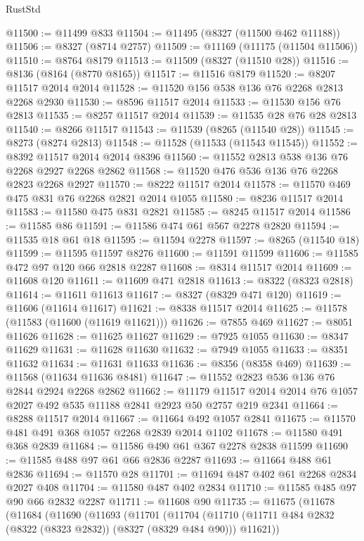 \begin{lexlean}{RustStd}
\begin{coremodule}
@11500 := @11499 @833
@11504 := @11495 (@8327 (@11500 @462 @11188))
@11506 := @8327 (@8714 @2757)
@11509 := @11169 (@11175 (@11504 @11506))
@11510 := @8764 @8179
@11513 := @11509 (@8327 (@11510 @28))
@11516 := @8136 (@8164 (@8770 @8165))
@11517 := @11516 @8179
@11520 := @8207 @11517 @2014 @2014
@11528 := @11520 @156 @538 @136 @76 @2268 @2813 @2268 @2930
@11530 := @8596 @11517 @2014
@11533 := @11530 @156 @76 @2813
@11535 := @8257 @11517 @2014
@11539 := @11535 @28 @76 @28 @2813
@11540 := @8266 @11517
@11543 := @11539 (@8265 (@11540 @28))
@11545 := @8273 (@8274 @2813)
@11548 := @11528 (@11533 (@11543 @11545))
@11552 := @8392 @11517 @2014 @2014 @8396
@11560 := @11552 @2813 @538 @136 @76 @2268 @2927 @2268 @2862
@11568 := @11520 @476 @536 @136 @76 @2268 @2823 @2268 @2927
@11570 := @8222 @11517 @2014
@11578 := @11570 @469 @475 @831 @76 @2268 @2821 @2014 @1055
@11580 := @8236 @11517 @2014
@11583 := @11580 @475 @831 @2821
@11585 := @8245 @11517 @2014
@11586 := @11585 @86
@11591 := @11586 @474 @61 @567 @2278 @2820
@11594 := @11535 @18 @61 @18
@11595 := @11594 @2278
@11597 := @8265 (@11540 @18)
@11599 := @11595 @11597 @8276
@11600 := @11591 @11599
@11606 := @11585 @472 @97 @120 @66 @2818 @2287
@11608 := @8314 @11517 @2014
@11609 := @11608 @120
@11611 := @11609 @471 @2818
@11613 := @8322 (@8323 @2818)
@11614 := @11611 @11613
@11617 := @8327 (@8329 @471 @120)
@11619 := @11606 (@11614 @11617)
@11621 := @8338 @11517 @2014
@11625 := @11578 (@11583 (@11600 (@11619 @11621)))
@11626 := @7855 @469
@11627 := @8051 @11626
@11628 := @11625 @11627
@11629 := @7925 @1055
@11630 := @8347 @11629
@11631 := @11628 @11630
@11632 := @7949 @1055
@11633 := @8351 @11632
@11634 := @11631 @11633
@11636 := @8356 (@8358 @469)
@11639 := @11568 (@11634 @11636 @8481)
@11647 := @11552 @2823 @536 @136 @76 @2844 @2924 @2268 @2862
@11662 := @11179
    @11517
    @2014
    @2014
    @76
    @1057
    @2027
    @492
    @535
    @11188
    @2841
    @2923
    @50
    @2757
    @219
    @2341
@11664 := @8288 @11517 @2014
@11667 := @11664 @492 @1057 @2841
@11675 := @11570 @481 @491 @368 @1057 @2268 @2839 @2014 @1102
@11678 := @11580 @491 @368 @2839
@11684 := @11586 @490 @61 @367 @2278 @2838 @11599
@11690 := @11585 @488 @97 @61 @66 @2836 @2287
@11693 := @11664 @488 @61 @2836
@11694 := @11570 @28
@11701 := @11694 @487 @402 @61 @2268 @2834 @2027 @408
@11704 := @11580 @487 @402 @2834
@11710 := @11585 @485 @97 @90 @66 @2832 @2287
@11711 := @11608 @90
@11735 := @11675
    (@11678
      (@11684
        (@11690
          (@11693
            (@11701
              (@11704
                (@11710 (@11711 @484 @2832 (@8322 (@8323 @2832)) (@8327 (@8329 @484 @90))) @11621))

\end{coremodule}
\end{lexlean}
